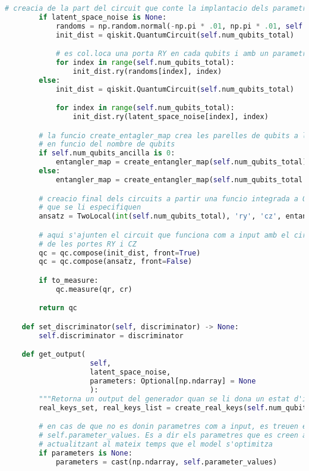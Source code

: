 \begin{lstlisting}[language=Python, caption=Codi final pel generador]
		# creacia de la part del circuit que conte la implantacio dels parametres d'input. En cas que no es donin aquests parametres es creen automaticament
		if latent_space_noise is None:
			randoms = np.random.normal(-np.pi * .01, np.pi * .01, self.num_qubits_total)
			init_dist = qiskit.QuantumCircuit(self.num_qubits_total)

			# es col.loca una porta RY en cada qubits i amb un parametre diferent cadascuna
			for index in range(self.num_qubits_total):
				init_dist.ry(randoms[index], index)
		else:
			init_dist = qiskit.QuantumCircuit(self.num_qubits_total)

			for index in range(self.num_qubits_total):
				init_dist.ry(latent_space_noise[index], index)

		# la funcio create_entagler_map crea les parelles de qubits a les qual col.locar les portes CZ
		# en funcio del nombre de qubits
		if self.num_qubits_ancilla is 0:
			entangler_map = create_entangler_map(self.num_qubits_total)
		else:
			entangler_map = create_entangler_map(self.num_qubits_total - self.num_qubits_ancilla)

		# creacio final dels circuits a partir una funcio integrada a Qiskit que va repetint les operacions
		# que se li especifiquen
		ansatz = TwoLocal(int(self.num_qubits_total), 'ry', 'cz', entanglement=entangler_map, reps=1, insert_barriers=True)

		# aqui s'ajunten el circuit que funciona com a input amb el circuit que consisteix en la repeticio
		# de les portes RY i CZ
		qc = qc.compose(init_dist, front=True)
		qc = qc.compose(ansatz, front=False)

		if to_measure:
			qc.measure(qr, cr)

		return qc

	def set_discriminator(self, discriminator) -> None:
		self.discriminator = discriminator

	def get_output(
					self,
					latent_space_noise,
					parameters: Optional[np.ndarray] = None
					):
		"""Retorna un output del generador quan se li dona un estat d'input i opcionalment uns parametres en especific. Els pixels estan compostos per la probabilitat que un qubit resulti en ket_0 en cada base. Per tant, els pixels de l'imatge estan normalitzats amb la norma l-1."""
		real_keys_set, real_keys_list = create_real_keys(self.num_qubits_total - self.num_qubits_ancilla)

		# en cas de que no es donin parametres com a input, es treuen els parametres de la variable
		# self.parameter_values. Es a dir els parametres que es creen automaticament al principi i que es van
		# actualitzant al mateix temps que el model s'optimitza
		if parameters is None:
			parameters = cast(np.ndarray, self.parameter_values)


\end{lstlisting}
